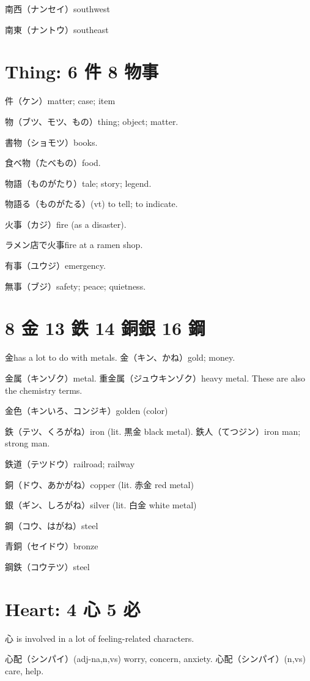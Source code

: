 南西（ナンセイ）southwest

南東（ナントウ）southeast

\section{Thing: 6 件 8 物事}

件（ケン）matter; case; item

物（ブツ、モツ、もの）thing; object; matter.

書物（ショモツ）books.

食べ物（たべもの）food.

物語（ものがたり）tale; story; legend.

物語る（ものがたる）(vt) to tell; to indicate.

火事（カジ）fire (as a disaster).

ラメン店で火事fire at a ramen shop.

有事（ユウジ）emergency.

無事（ブジ）safety; peace; quietness.

\section{8 金 13 鉄 14 銅銀 16 鋼}

金has a lot to do with metals.
金（キン、かね）gold; money.

金属（キンゾク）metal.
重金属（ジュウキンゾク）heavy metal.
These are also the chemistry terms.

金色（キンいろ、コンジキ）golden (color)

鉄（テツ、くろがね）iron (lit. 黒金 black metal).
鉄人（てつジン）iron man; strong man.

鉄道（テツドウ）railroad; railway

銅（ドウ、あかがね）copper (lit. 赤金 red metal)

銀（ギン、しろがね）silver (lit. 白金 white metal)

鋼（コウ、はがね）steel

青銅（セイドウ）bronze

鋼鉄（コウテツ）steel

\section{Heart: 4 心 5 必}

心 is involved in a lot of feeling-related characters.

心配（シンパイ）(adj-na,n,vs) worry, concern, anxiety.
心配（シンパイ）(n,vs) care, help.


